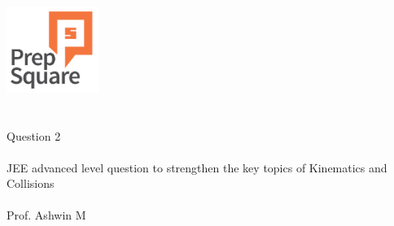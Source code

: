 \documentclass{beamer}
\begin{document}
\begin{center}
\ \\ \ \\
\includegraphics[width=30mm]{Logo-final.png} \\
\ \\ \ \\ 
{\huge Question 2 \\ \ \\ }
{\Large
JEE advanced level question to strengthen the key topics of Kinematics and Collisions
}
{\large \ \\ \ \\ Prof. Ashwin M }
\end{center}
\end{document}

